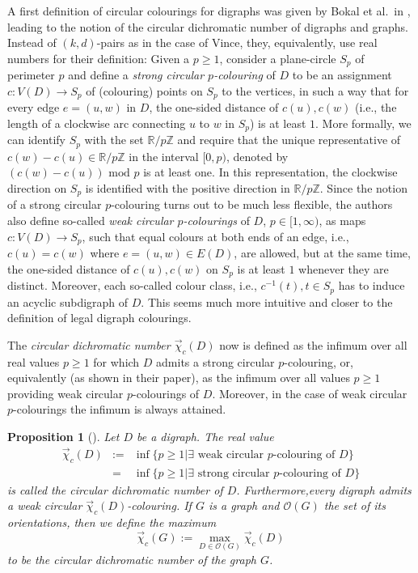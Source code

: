 \documentclass[fontsize=11pt,a4paper,DIV12]{scrartcl}
\def\n{\par\noindent}
\theoremstyle{meiner}
\newtheorem{proposition}{Proposition}
\theoremstyle{definition}
\begin{document}
A first definition of circular colourings for digraphs was given by
Bokal et al.\ in \cite{bokal}, leading to the notion of the circular
dichromatic number of digraphs and graphs. Instead of $(k,d)$-pairs as
in the case of Vince, they, equivalently, use real numbers for their
definition: Given a $p \ge 1$, consider a plane-circle $S_p$ of
perimeter $p$ and define a \emph{strong circular $p$-colouring} of $D$
to be an assignment $c:V(D) \rightarrow S_p$ of (colouring) points on
$S_p$ to the vertices, in such a way that for every edge $e=(u,w)$ in
$D$, the one-sided distance of $c(u),c(w)$ (i.e., the length of a
clockwise arc connecting $u$ to $w$ in $S_p$) is at least $1$. More
formally, we can identify $S_p$ with the set $\mathbb{R}/p\mathbb{Z}$
and require that the unique representative of $c(w)-c(u) \in
\mathbb{R}/p\mathbb{Z}$ in the interval $[0,p)$, denoted by
$(c(w)-c(u)) \text{ mod }p$ is at least one. In this representation,
the clockwise direction on $S_p$ is identified with the positive
direction in $\mathbb{R}/p\mathbb{Z}$.  Since the notion of a strong
circular $p$-colouring turns out to be much less flexible, the authors
also define so-called \emph{weak circular $p$-colourings} of $D$, $p
\in [1,\infty)$, as maps $c:V(D) \rightarrow S_p$, such that equal
colours at both ends of an edge, i.e., $c(u)=c(w)$ where $e=(u,w) \in
E(D)$, are allowed, but at the same time, the one-sided distance of
$c(u),c(w)$ on $S_p$ is at least $1$ whenever they are distinct.
Moreover, each so-called colour class, i.e., $c^{-1}(t), t \in S_p$
has to induce an acyclic subdigraph of $D$. This seems much more
intuitive and closer to the definition of legal digraph colourings. \n
The {\em circular dichromatic number $\vec{\chi}_c(D)$} now is defined
as the infimum over all real values $p \ge 1$ for which $D$ admits a
strong circular $p$-colouring, or, equivalently (as shown in their
paper), as the infimum over all values $p \ge 1$ providing weak
circular $p$-colourings of $D$. Moreover, in the case of weak circular
$p$-colourings the infimum is always attained.

\begin{proposition}[\cite{bokal}] \label{circdic}
Let $D$ be a digraph. The real value
\begin{eqnarray*}
\vec{\chi}_c(D)&:=&\inf\{p \ge 1|\exists \text{ weak circular }p\text{-colouring of } D\}\\&=&\inf\{p \ge 1|\exists \text{ strong circular }p\text{-colouring of } D\}
\end{eqnarray*}
is called the \emph{circular dichromatic number} of $D$.
Furthermore,every digraph admits a weak circular
$\vec{\chi}_c(D)$-colouring. If $G$ is a graph and $\mathcal{O}(G)$
the set of its orientations, then we define the maximum
$$\vec{\chi}_c(G):=\max_{D \in \mathcal{O}(G)}{\vec{\chi}_c(D)}$$ to be the \emph{circular dichromatic number} of the graph $G$.
\end{proposition}
\end{document}
